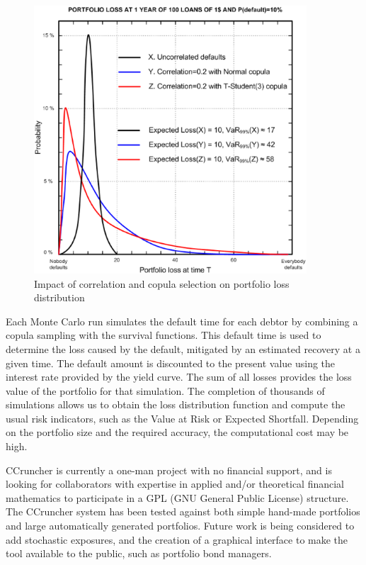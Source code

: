 \documentclass[a4paper,12pt,final]{article}
\begin{document}
\begin{figure}[!hbt]
\begin{center}
\includegraphics[height=10cm]{./images/ercim78.eps}
\caption{Impact of correlation and copula selection on portfolio loss distribution}
\label{survival}
\end{center}
\end{figure}
\FloatBarrier

Each Monte Carlo run simulates the default time for each debtor by combining a copula 
sampling with the survival functions. This default time is used to determine the loss 
caused by the default, mitigated by an estimated recovery at a given time. The default 
amount is discounted to the present value using the interest rate provided by the yield 
curve. The sum of all losses provides the loss value of the portfolio for that simulation. 
The completion of thousands of simulations allows us to obtain the loss distribution 
function and compute the usual risk indicators, such as the Value at Risk or Expected 
Shortfall. Depending on the portfolio size and the required accuracy, the computational 
cost may be high.
\newline

CCruncher is currently a one-man project with no financial support, and is looking 
for collaborators with expertise in applied and/or theoretical financial mathematics 
to participate in a GPL (GNU General Public License) structure. The CCruncher 
system has been tested against both simple hand-made portfolios and large automatically 
generated portfolios. Future work is being considered to add stochastic exposures, and 
the creation of a graphical interface to make the tool available to the public, such as 
portfolio bond managers.
\end{document}
